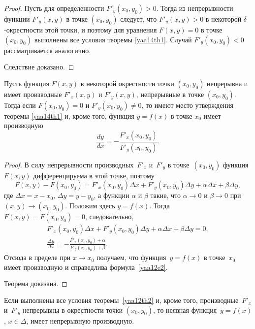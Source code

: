\begin{proof}
Пусть для определенности $F'_y(x_0,y_0)>0$. Тогда из непрерывности функции $F'_y(x,y)$ в точке $(x_0,y_0)$ следует, что $F'_y(x,y)>0$ в некоторой $\delta$-окрестности этой точки, и поэтому для уравнения $F(x,y)=0$ в точке $(x_0,y_0)$ выполнены все условия теоремы \ref{yaa14th1}. Случай $F'_y(x_0,y_0)<0$ рассматривается аналогично.

Следствие доказано.
\end{proof}

\begin{thm} \label{yaa12th2}
Пусть функция $F(x,y)$ в некоторой окрестности точки $(x_0,y_0)$ непрерывна и имеет производные $F'_x(x,y)$ и $F'_y(x,y)$, непрерывные в точке $(x_0,y_0)$. Тогда если $F(x_0,y_0)=0$ и $F'_y(x_0,y_0)\ne 0$, то имеют место утверждения теоремы \ref{yaa14th1} и, кроме того, функция $y=f(x)$ в точке $x_0$ имеет производную
\begin{equation}\label{yaa12e2}
\frac{dy}{dx} = -\frac{F'_x(x_0,y_0)}{F'_y(x_0,y_0)}.
\end{equation}
\end{thm}

\begin{proof}
В силу непрерывности производных~$F'_x$ и~$F'_y$ в точке~$(x_0,y_0)$ функция~$F(x,y)$ дифференцируема в этой точке, поэтому
$$
F(x,y)-F(x_0,y_0)=F'_x(x_0,y_0)\Delta x+F'_y(x_0,y_0)\Delta y+\alpha\Delta x+\beta\Delta y,
$$
где $\Delta x=x-x_0,\, \Delta y = y-y_0$, а функции $\alpha$ и $\beta$ такие, что $\alpha\to 0$ и $\beta \to 0$ при $(x,y)\to (x_0,y_0)$. Положим здесь $y=f(x)$. Тогда $F(x,y) = F(x_0,y_0)=0$, следовательно,
\begin{gather*}
F'_x(x_0,y_0)\Delta x+F'_y(x_0,y_0)\Delta y + \alpha\Delta x+\beta\Delta y=0,\\
\frac{\Delta y}{\Delta x} = -\frac{F'_x(x_0,y_0)+\alpha}{F'_y(x_0,y_0)+\beta}.
\end{gather*}
Отсюда в пределе при $x \to x_0$ получаем, что функция~$y=f(x)$ в точке~$x_0$ имеет производную и справедлива формула~\eqref{yaa12e2}.

Теорема доказана.
\end{proof}

\begin{cons}\label{yaa12c2}
Если выполнены все условия теоремы~\ref{yaa12th2} и, кроме того, производные~$F'_x$ и~$F'_y$ непрерывны в окрестности точки $(x_0,y_0)$, то неявная функция~$y=f(x)$, $x\in\Delta$, имеет непрерывную производную.
\end{cons}

